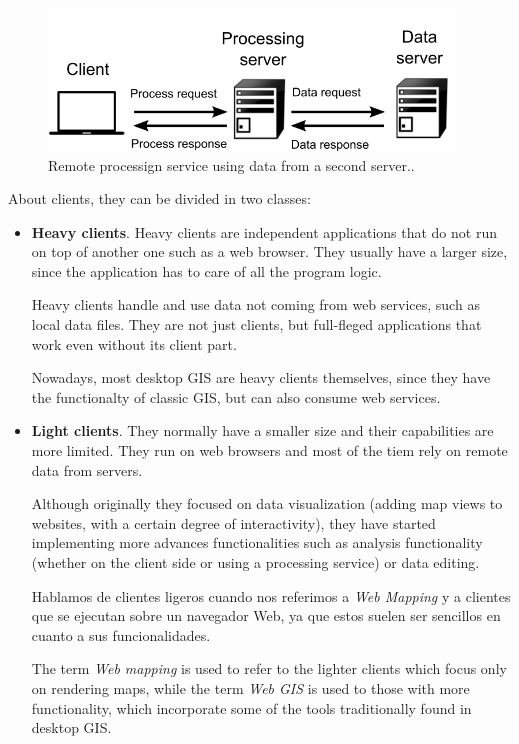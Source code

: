\begin{itemize}
\begin{figure}[!hbt]   
\centering
\includegraphics[width=0.95\textwidth]{Software/Remote_data_and_services.png}
\caption{\small Remote processign service using data from a second server..}
\label{Fig:Remote_data_and_services} 
\end{figure}

\end{itemize}

About clients, they can be divided in two classes:

\begin{itemize}

	\item \textbf{Heavy clients}. Heavy clients are independent applications that do not run on top of another one such as a web browser. They usually have a larger size, since the application has to care of all the program logic.

	Heavy clients handle and use data not coming from web services, such as local data files. They are not just clients, but full-fleged applications that work even without its client part.

	Nowadays, most desktop GIS are heavy clients themselves, since they have the functionalty of classic GIS, but can also consume web services.


	\item \textbf{Light clients}. They normally have a smaller size and their capabilities are more limited. They run on web browsers and most of the tiem rely on remote data from servers.

	Although originally they focused on data visualization (adding map views to websites, with a certain degree of interactivity), they have started implementing more advances functionalities such as analysis functionality (whether on the client side or using a processing service) or data editing.

	Hablamos de clientes ligeros cuando nos referimos a \emph{Web Mapping} y a clientes que se ejecutan sobre un navegador Web, ya que estos suelen ser sencillos en cuanto a sus funcionalidades.
	
	The term \emph{Web mapping} is used to refer to the lighter clients which focus only on rendering maps, while the term \emph{Web GIS} is used to those with more functionality, which incorporate some of the tools traditionally found in desktop GIS.
\end{itemize}

